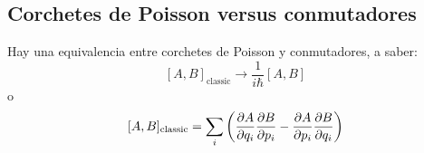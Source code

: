 \documentclass[10pt,oneside]{CBFT_book}
\begin{document}
\subsection{Corchetes de Poisson versus conmutadores}

Hay una equivalencia entre corchetes de Poisson y conmutadores, a saber:
\[
	[A, B]_{\text{classic}} \longrightarrow \frac{1}{i\hbar}[A,B]
\]
o
\[
	[A, B]_{\text{classic}} = \sum_i \left( \dpar{A}{q_i} \dpar{B}{p_i} - \dpar{A}{p_i} \dpar{B}{q_i} \right)
\]

\end{document}
